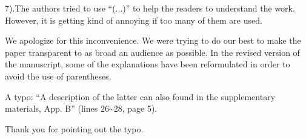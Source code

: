 \begin{reviewer}
7).The authors tried to use  ``(...)'' to help the readers to understand the work. However, it is getting kind of annoying if too many of them are used.
\end{reviewer}
\begin{authors}
We apologize for this inconvenience.
We were trying to do our best to make the paper transparent to as broad an audience as possible.
In the revised version of the manuscript, some of the explanations have been reformulated in order to avoid the use of parentheses.

\begin{actions}
\end{actions}
\end{authors}

\begin{reviewer}
A typo: ``A description of the latter can also found in the supplementary materials, App. B'' (lines 26\~{}28, page 5).
\end{reviewer}
\begin{authors}
Thank you for pointing out the typo.

\begin{actions}
\end{actions}
\end{authors}
